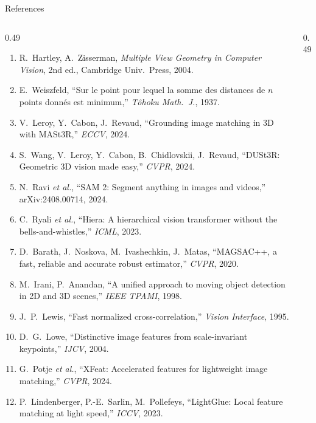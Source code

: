 \documentclass[aspectratio=169,10pt]{beamer}
\begin{document}
\begin{frame}{References}
  \begin{columns}[T]
    \begin{column}{0.49\textwidth}
      \tiny
      \begin{enumerate}
        \item[{[1]}] R.~Hartley, A.~Zisserman, \emph{Multiple View Geometry in Computer Vision}, 2nd ed., Cambridge Univ.\ Press, 2004.
        \item[{[2]}] E.~Weiszfeld, ``Sur le point pour lequel la somme des distances de $n$ points donn\'es est minimum,'' \emph{T\^ohoku Math.\ J.}, 1937.
        \item[{[3]}] V.~Leroy, Y.~Cabon, J.~Revaud, ``Grounding image matching in 3D with MASt3R,'' \emph{ECCV}, 2024.
        \item[{[4]}] S.~Wang, V.~Leroy, Y.~Cabon, B.~Chidlovskii, J.~Revaud, ``DUSt3R: Geometric 3D vision made easy,'' \emph{CVPR}, 2024.
        \item[{[5]}] N.~Ravi \emph{et al.}, ``SAM 2: Segment anything in images and videos,'' arXiv:2408.00714, 2024.
        \item[{[6]}] C.~Ryali \emph{et al.}, ``Hiera: A hierarchical vision transformer without the bells-and-whistles,'' \emph{ICML}, 2023.
        \item[{[7]}] D.~Barath, J.~Noskova, M.~Ivashechkin, J.~Matas, ``MAGSAC++, a fast, reliable and accurate robust estimator,'' \emph{CVPR}, 2020.
        \item[{[8]}] M.~Irani, P.~Anandan, ``A unified approach to moving object detection in 2D and 3D scenes,'' \emph{IEEE TPAMI}, 1998.
        \item[{[9]}] J.~P.~Lewis, ``Fast normalized cross-correlation,'' \emph{Vision Interface}, 1995.
        \item[{[10]}] D.~G.~Lowe, ``Distinctive image features from scale-invariant keypoints,'' \emph{IJCV}, 2004.
        \item[{[11]}] G.~Potje \emph{et al.}, ``XFeat: Accelerated features for lightweight image matching,'' \emph{CVPR}, 2024.
        \item[{[12]}] P.~Lindenberger, P.-E.~Sarlin, M.~Pollefeys, ``LightGlue: Local feature matching at light speed,'' \emph{ICCV}, 2023.
      \end{enumerate}
    \end{column}
    \begin{column}{0.49\textwidth}

\end{column}
\end{columns}
\end{frame}
\end{document}
